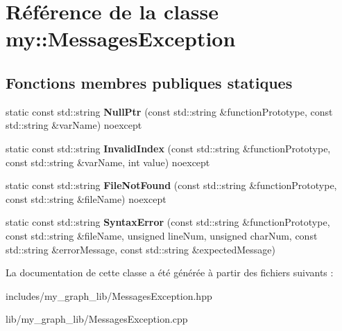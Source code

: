 \hypertarget{classmy_1_1MessagesException}{}\section{Référence de la classe my\+:\+:Messages\+Exception}
\label{classmy_1_1MessagesException}
\subsection*{Fonctions membres publiques statiques}
\begin{DoxyCompactItemize}
\item 
\mbox{\label{classmy_1_1MessagesException_a674b0f2037360cef55477d31b81258d6}} 
static const std\+::string {\bfseries Null\+Ptr} (const std\+::string \&function\+Prototype, const std\+::string \&var\+Name) noexcept
\item 
\mbox{\label{classmy_1_1MessagesException_a96756489d482f7d0196a3047679a6c7d}} 
static const std\+::string {\bfseries Invalid\+Index} (const std\+::string \&function\+Prototype, const std\+::string \&var\+Name, int value) noexcept
\item 
\mbox{\label{classmy_1_1MessagesException_ad1683b3ea0240b2b7aeddfcc1a2edf17}} 
static const std\+::string {\bfseries File\+Not\+Found} (const std\+::string \&function\+Prototype, const std\+::string \&file\+Name) noexcept
\item 
\mbox{\label{classmy_1_1MessagesException_a3e2aa4d58e6781c9d75373a3e9329666}} 
static const std\+::string {\bfseries Syntax\+Error} (const std\+::string \&function\+Prototype, const std\+::string \&file\+Name, unsigned line\+Num, unsigned char\+Num, const std\+::string \&error\+Message, const std\+::string \&expected\+Message)
\end{DoxyCompactItemize}


La documentation de cette classe a été générée à partir des fichiers suivants \+:\begin{DoxyCompactItemize}
\item 
includes/my\+\_\+graph\+\_\+lib/Messages\+Exception.\+hpp\item 
lib/my\+\_\+graph\+\_\+lib/Messages\+Exception.\+cpp\end{DoxyCompactItemize}
